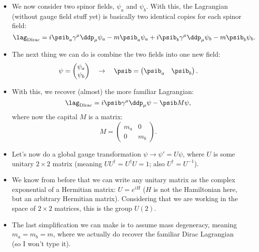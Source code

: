 \begin{itemize}
    \item We now consider two spinor fields, $\psi_a$ and $\psi_b$. With this, the Lagrangian (without gauge field stuff yet) is basically two identical copies for each spinor field:
        \begin{equation}
            \lag_{\mathrm{Dirac}} = i\psib_a \gamma^{\mu}\ddp_{\mu} \psi_a - m\psib_a\psi_a + i\psib_b \gamma^{\mu}\ddp_{\mu} \psi_b - m\psib_b\psi_b.
        \end{equation}
    \item The next thing we can do is combine the two fields into one new field:
        \begin{equation}
            \psi = \begin{pmatrix}\psi_a \\ \psi_b\end{pmatrix} \quad\rightarrow\quad \psib = \begin{pmatrix}\psib_a & \psib_b\end{pmatrix}.
        \end{equation}
    \item With this, we recover (almost) the more familiar Lagrangian:
        \begin{equation}
            \lag_{\mathrm{Dirac}} = i\psib \gamma^{\mu}\ddp_{\mu} \psi - \psib M \psi,
        \end{equation}
        where now the capital $M$ is a matrix:
        \begin{equation}
            M = \begin{pmatrix}m_a & 0 \\ 0 & m_b\end{pmatrix}.
        \end{equation}
    \item Let's now do a global gauge transformation $\psi \rightarrow \psi' = U\psi$, where $U$ is some unitary $2\times2$ matrix (meaning $UU^{\dagger} = U^{\dagger}U = 1$; also $U^{\dagger} = U^{-1}$).
    \item We know from before that we can write any unitary matrix as the complex exponential of a Hermitian matrix: $U = e^{iH}$ ($H$ is not the Hamiltonian here, but an arbitrary Hermitian matrix). Considering that we are working in the space of $2\times2$ matrices, this is the group $U(2)$.
    \item The last simplification we can make is to assume mass degeneracy, meaning $m_a=m_b=m$, where we actually do recover the familiar Dirac Lagrangian (so I won't type it).

\end{itemize}
